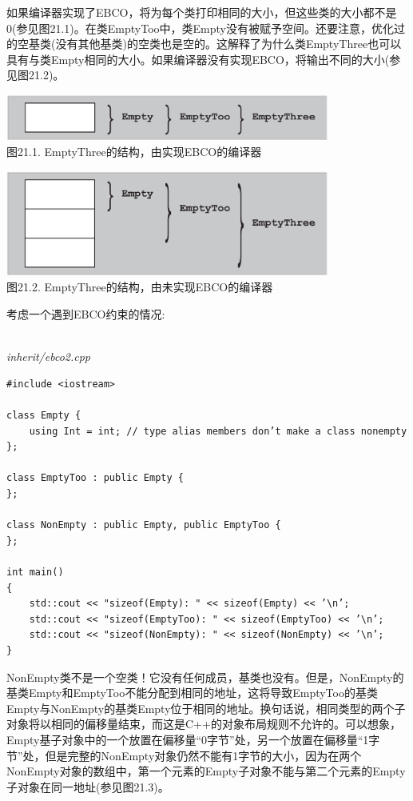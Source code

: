 如果编译器实现了EBCO，将为每个类打印相同的大小，但这些类的大小都不是0(参见图21.1)。在类EmptyToo中，类Empty没有被赋予空间。还要注意，优化过的空基类(没有其他基类)的空类也是空的。这解释了为什么类EmptyThree也可以具有与类Empty相同的大小。如果编译器没有实现EBCO，将输出不同的大小(参见图21.2)。

\begin{center}
\includegraphics[width=0.8\textwidth]{content/3/chapter21/images/1.png} \\
图21.1. EmptyThree的结构，由实现EBCO的编译器
\end{center}

\begin{center}
\includegraphics[width=0.8\textwidth]{content/3/chapter21/images/2.png} \\
图21.2. EmptyThree的结构，由未实现EBCO的编译器
\end{center}

考虑一个遇到EBCO约束的情况:

\hspace*{\fill} \\ %
\noindent
\textit{inherit/ebco2.cpp}
\begin{lstlisting}[style=styleCXX]
#include <iostream>

class Empty {
	using Int = int; // type alias members don’t make a class nonempty
};

class EmptyToo : public Empty {
};

class NonEmpty : public Empty, public EmptyToo {
};

int main()
{
	std::cout << "sizeof(Empty): " << sizeof(Empty) << ’\n’;
	std::cout << "sizeof(EmptyToo): " << sizeof(EmptyToo) << ’\n’;
	std::cout << "sizeof(NonEmpty): " << sizeof(NonEmpty) << ’\n’;
}
\end{lstlisting}

NonEmpty类不是一个空类！它没有任何成员，基类也没有。但是，NonEmpty的基类Empty和EmptyToo不能分配到相同的地址，这将导致EmptyToo的基类Empty与NonEmpty的基类Empty位于相同的地址。换句话说，相同类型的两个子对象将以相同的偏移量结束，而这是C++的对象布局规则不允许的。可以想象，Empty基子对象中的一个放置在偏移量“0字节”处，另一个放置在偏移量“1字节”处，但是完整的NonEmpty对象仍然不能有1字节的大小，因为在两个NonEmpty对象的数组中，第一个元素的Empty子对象不能与第二个元素的Empty子对象在同一地址(参见图21.3)。

